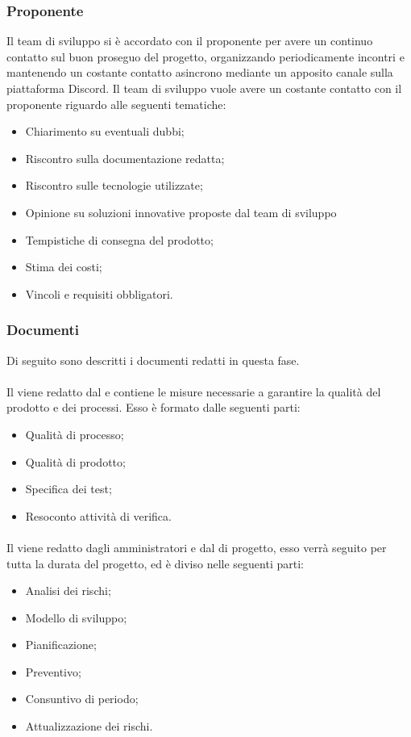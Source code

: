 \subsubsection{Proponente}\label{subsubsection: proponente_fornitura}
Il team di sviluppo si è accordato con il proponente per avere un continuo contatto sul buon proseguo del progetto, organizzando periodicamente incontri e mantenendo un costante contatto asincrono mediante un apposito canale sulla piattaforma Discord\glo{}.
Il team di sviluppo vuole avere un costante contatto con il proponente riguardo alle seguenti tematiche:
\begin {itemize}
    \item Chiarimento su eventuali dubbi;
    \item Riscontro sulla documentazione redatta;
    \item Riscontro sulle tecnologie utilizzate;
    \item Opinione su soluzioni innovative proposte dal team di sviluppo
    \item Tempistiche di consegna del prodotto;
    \item Stima dei costi;
    \item Vincoli e requisiti obbligatori.
\end{itemize}
\subsubsection {Documenti}\label{subsubsection: documenti_fornitura}
Di seguito sono descritti i documenti redatti in questa fase.
\paragraph{\docNamePdQ{}}\label{paragraph: PdQ_fornitura}
Il \docNamePdQLow{} viene redatto dal \roleVerifierLow{} e contiene le misure necessarie a garantire la qualità del prodotto e dei processi.
Esso è formato dalle seguenti parti:
\begin{itemize}
    \item Qualità di processo;
    \item Qualità di prodotto;
    \item Specifica dei test;
    \item Resoconto attività di verifica.
\end{itemize}
\paragraph{\docNamePdP{}}\label{paragraph: PdP_fornitura}
Il \docNamePdPLow{} viene redatto dagli amministratori e dal \roleProjectManagerLow{} di progetto, esso verrà seguito per tutta la durata del progetto, ed è diviso nelle seguenti parti:
\begin{itemize}
    \item Analisi dei rischi;
    \item Modello di sviluppo;
    \item Pianificazione;
    \item Preventivo;
    \item Consuntivo di periodo;
    \item Attualizzazione dei rischi.
\end{itemize} 

